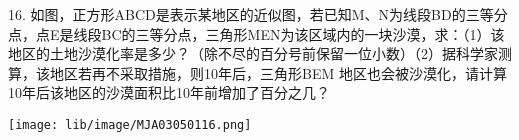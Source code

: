 16. 如图，正方形ABCD是表示某地区的近似图，若已知M、N为线段BD的三等分点，点E是线段BC的三等分点，三角形MEN为该区域内的一块沙漠，求：（1）该地区的土地沙漠化率是多少？（除不尽的百分号前保留一位小数）（2）据科学家测算，该地区若再不采取措施，则10年后，三角形BEM 地区也会被沙漠化，请计算10年后该地区的沙漠面积比10年前增加了百分之几？

\begin{flushright}

    \texttt{[image: lib/image/MJA03050116.png]}

\end{flushright}



